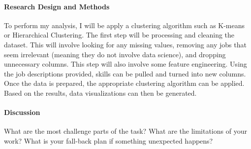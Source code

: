 \documentclass[12pt]{article}
\begin{document}
\paragraph{Research Design and Methods}

To perform my analysis, I will be apply a clustering algorithm such as K-means or Hierarchical Clustering. The first
step will be processing and cleaning the dataset. This will involve looking for any missing values, removing any jobs 
that seem irrelevant (meaning they do not involve data science), and dropping unnecessary columns. This step will also involve some 
feature engineering. Using the job descriptions provided, skills can be pulled and turned into new columns. Once the data is 
prepared, the appropriate clustering algorithm can be applied. Based on the results, data visualizations can then be generated.

\paragraph{Discussion}
What are the most challenge parts of the task?
What are the limitations of your work? What is your fall-back plan if
something unexpected happens?




\end{document}
